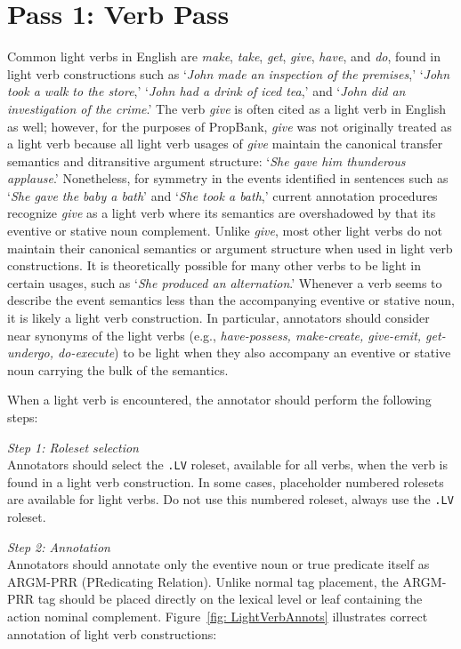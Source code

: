 \documentclass[11pt]{report}
\begin{document}
\section{Pass 1: Verb Pass}
Common light verbs in English are \textit{make}, \textit{take}, \textit{get}, \textit{give}, \textit{have}, and \textit{do}, found in light verb constructions such as `\textit{John made an inspection of the premises},' `\textit{John took a walk to the store},' `\textit{John had a drink of iced tea},' and `\textit{John did an investigation of the crime}.'  The verb \textit{give} is often cited as a light verb in English as well; however, for the purposes of PropBank, \textit{give} was not originally treated as a light verb because all light verb usages of \textit{give} maintain the canonical transfer semantics and ditransitive argument structure: `\textit{She gave him thunderous applause}.'  Nonetheless, for symmetry in the events identified in sentences such as `\textit{She gave the baby a bath}' and `\textit{She took a bath},' current annotation procedures recognize \textit{give} as a light verb where its semantics are overshadowed by that its eventive or stative noun complement.  Unlike \textit{give}, most other light verbs do not maintain their canonical semantics or argument structure when used in light verb constructions.  It is theoretically possible for many other verbs to be light in certain usages, such as `\textit{She produced an alternation}.'  Whenever a verb seems to describe the event semantics less than the accompanying eventive or stative noun, it is likely a light verb construction.  In particular, annotators should consider near synonyms of the light verbs (e.g., \textit{have-possess, make-create, give-emit, get-undergo, do-execute}) to be light when they also accompany an eventive or stative noun carrying the bulk of the semantics.   

When a light verb is encountered, the annotator should perform the following steps:

\textit{Step 1: Roleset selection}\\
Annotators should select the \texttt{.LV} roleset, available for all verbs, when the verb is found in a light verb construction.  In some cases, placeholder numbered rolesets are available for light verbs.  Do not use this numbered roleset, always use the \texttt{.LV} roleset.  

\textit{Step 2: Annotation}\\
Annotators should annotate only the eventive noun or true predicate itself as ARGM-PRR (PRedicating Relation). Unlike normal tag placement, the ARGM-PRR tag should be placed directly on the lexical level or leaf containing the action nominal complement. Figure~\ref{fig: LightVerbAnnots} illustrates correct annotation of light verb constructions: 
\end{document}
